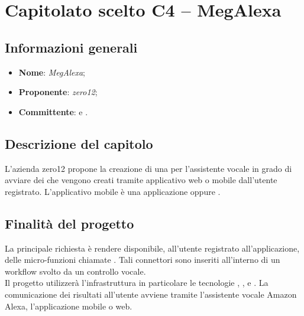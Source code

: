 \section{Capitolato scelto C4 – MegAlexa}

\subsection{Informazioni generali}

\begin{itemize}
\item \textbf{Nome}: \textit{MegAlexa};
\item \textbf{Proponente}: \textit{zero12};
\item \textbf{Committente}: \commitNameM \mbox{} e \commitNameS.
\end{itemize}

\subsection{Descrizione del capitolo}
L'azienda zero12 propone la creazione di una  per l’assistente vocale  in grado di avviare dei  che vengono creati tramite applicativo web o mobile dall’utente registrato. L’applicativo mobile è  una applicazione  oppure .

\subsection{Finalità del progetto}
La principale richiesta è rendere disponibile, all’utente registrato all'applicazione, delle micro-funzioni chiamate .
Tali connettori sono inseriti all’interno di un workflow svolto da un controllo vocale. \\
Il progetto utilizzerà l’infrastruttura  in particolare le tecnologie , ,  e . La comunicazione dei risultati all’utente avviene tramite l’assistente vocale Amazon Alexa, l’applicazione mobile o web.

